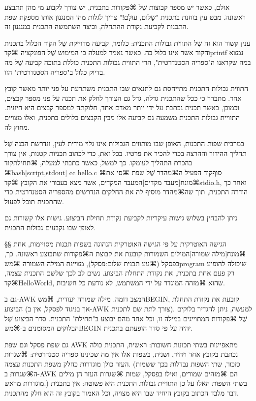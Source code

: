 אולם, כאשר יש מספר קבוצות שֶׁל ⌘פקודות בתכנית, יש צורך לקבוע מי מהן תתבצע
ראשונה. מבט עין בוחנת בתכנית "שָׁלוֹם, עוֹלָם!" צריך לגלות מהו המנגנון אותו מספקת
שפת התכנות לקביעת נקודת ההתחלה, וכיצד השתמשה התכנית במנגנון זה.

ענין קשור הוא זה שֶׁל התווית גבולות התכנית: כלומר, קביעה מדוייקת
שֶׁל הקוד הכלול בתכנית והקוד אשר אינו כלול בה. כאשר נאמר למעלה כי המימוש שֶׁל
הפונקציה ⌘קד{printf} נמצא במה שקראנו ה"ספריה הסטנדרטית", הרי התווית גבולות
התכנית כוללת בתוכה קביעה שֶׁל מה בדיוק כלול ב"ספריה הסטנדרטית" הזו.

התווית גבולות התכנית מתייחסת גם לתנאים שבו התכנית משתרעת על פני יותר מאשר
קובץ אחד. מתברר כי ככל שהתכנית גדלה, גדל גם הצורך לחלק את תכנה על פני מספר
קבצים, וכמובן, כאשר תכנית נכתבת על ידי יותר מאדם אחד, חלוקתה למספר קבצים היא
חיונית. התוויית גבולות התכנית משמעה גם קביעה אלו מבין הקבצים כלולים בתכנית,
ואלו מצויים מחוץ לה.

במרבית שפות התכנות, האופן שבו מותווים הגבולות אינו גלוי מידית לעין, ונדרשת
הבנה שֶׁל תהליך ההידור וההרצה בכדי להכיר את פרטיו. בכל זאת, כדי לכתוב תכניות
קטנות, אין צורך בהכרת התהליך לעומקו. כך למשל, כאשר כתבתי למעלה,
⌘תחילת{קוד}
⌘bash[script,stdout]
cc hello.c
\END
⌘סוף{קוד}
הפעיל ה⌘מהדר שֶׁל שפת ⌘סי את ⌘מונח[מעבד מקדים]{המעבד המקדים}, אשר מצא בעבורי את הקובץ
⌘קד{stdio.h}, ואחר כך הודרה התכנית, תוך שה⌘מהדר מוסיף לה את החלקים הנדרשים
מהספריה הסטנדרטית כדי שהתכנית תוכל לפעול.

ניתן להבחין בשלוש גישות עיקריות לקביעת נקודת תחילת הביצוע. גישות אלו קשורות
גם לאופן שבו נקבעים גבולות התכנית.

§§ הגישה האוטרקית
על פי הגישה האוטרקית הנהוגה בשפות תכנות מסויימות, אחת ⌘מונח[מילה שמורה]{המילים
השמורות} קובעת את קבוצת ה⌘פקודות שתבוצע ראשונה. כך, בפסקל (⌘עע תכנית
שלום:פסקל), מציינת המילה השמורה ⌘מש{program} שיכולה להופיע רק פעם אחת בתכנית,
את נקודת התחלת הביצוע. נשים לב לכך שלשם התכנית עצמה, ⌘קד{HelloWorld}, שהוא
⌘מזהה המוגדר על ידי המשתמש, לא נודעת כל חשיבות.

גם ב-AWK המצב דומה. מילה שמורה יעודית, ⌘מש{BEGIN}, קובעת את נקודת התחלת
הביצוע (אך בניגוד לפסקל, אין ב-AWK צורך לתת שם לתכנית).
למעשה, ניתן להגדיר בלוקים שֶׁל ⌘פקודות המתוייגים במילה זו, וכל אחד מהם
יבוצע ב"תחילת" התכנית. סדר הביצוע שֶׁל הבלוקים המסומנים ב-⌘מש{BEGIN}
יהיה על פי סדר הופעתם בתכנית.

גם שפת פסקל וגם שפת AWK מתאפיינות בשתי תכונות חשובות: ראשית, התכנית כולה נכתבת
בקובץ אחד ויחיד, ושנית, בשפות אלו אין מה שכינינו ספריה סטנדרטית: ⌘שגרות העזר
כולן מוגדרות כחלק משפת התכנות עצמה. (כזכור, שתי השפות נבדלות בכך ששמות ה⌘שגרות
ב-AWK הם ⌘מזהים שמורים, ואילו בפסקל, שמות ⌘שגרות העזר הן מילים מוגדרות מראש.)
בשתי השפות האלו על כן התוויית גבולות התכנית היא פשוטה: אין בתכנית דבר מלבד
הכתוב בקובץ היחיד שבו היא מצויה, וכל האמור בקובץ זה הוא חלק מהתכנית.

